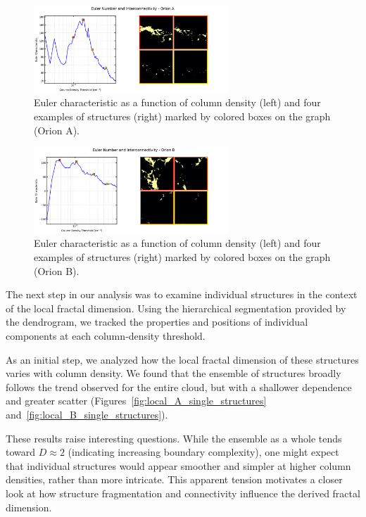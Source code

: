 \begin{figure}[t]
    \centering
    \includegraphics[width=0.65\textwidth]{figures/euler_Orion_A.png}
    \caption{Euler characteristic as a function of column density (left) and four examples of structures (right) marked by colored boxes on the graph (Orion A).}
    \label{fig:Euler_Orion_A}
\end{figure}

\begin{figure}[t]
    \centering
    \includegraphics[width=0.65\textwidth]{figures/euler_Orion_B.png}
    \caption{Euler characteristic as a function of column density (left) and four examples of structures (right) marked by colored boxes on the graph (Orion B).}
    \label{fig:Euler_Orion_B}
\end{figure}

The next step in our analysis was to examine individual structures in the context of the local fractal dimension.  
Using the hierarchical segmentation provided by the dendrogram, we tracked the properties and positions of individual components at each column‑density threshold.

As an initial step, we analyzed how the local fractal dimension of these structures varies with column density.  
We found that the ensemble of structures broadly follows the trend observed for the entire cloud, but with a shallower dependence and greater scatter (Figures~\ref{fig:local_A_single_structures} and~\ref{fig:local_B_single_structures}).  

These results raise interesting questions.  
While the ensemble as a whole tends toward \(D \approx 2\) (indicating increasing boundary complexity), one might expect that individual structures would appear smoother and simpler at higher column densities, rather than more intricate.  
This apparent tension motivates a closer look at how structure fragmentation and connectivity influence the derived fractal dimension.

